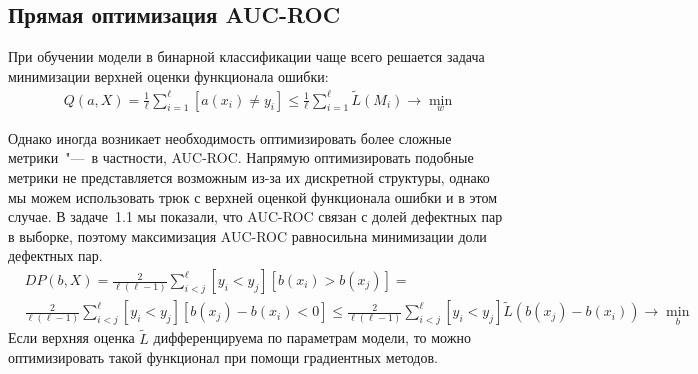 \documentclass[12pt,a4paper]{article}
\begin{document}
	\subsection{Прямая оптимизация AUC-ROC}
	\par При обучении модели в бинарной классификации чаще всего решается задача минимизации верхней оценки функционала ошибки:
	\begin{align*}
	Q(a, X) = \frac{1}{\ell}\sum_{i=1}^\ell [a(x_i) \ne y_i] \le \frac{1}{\ell} \sum_{i=1}^\ell \tilde{L}(M_i) \to \min_w
	\end{align*}
	
	Однако иногда возникает необходимость оптимизировать более сложные метрики~"---~в частности, AUC-ROC. Напрямую оптимизировать подобные метрики не представляется возможным из-за их дискретной структуры, однако мы можем использовать трюк с верхней оценкой функционала ошибки и в этом случае. В задаче~1.1 мы показали, что AUC-ROC связан с долей дефектных пар в выборке, поэтому максимизация AUC-ROC равносильна минимизации доли дефектных пар.
	\begin{align*}
	&DP(b, X) = \frac{2}{\ell (\ell - 1)}\sum_{i < j}^\ell [y_i < y_j] [b(x_i) > b(x_j)] =\\  &\frac{2}{\ell (\ell - 1)}\sum_{i < j}^\ell  [y_i < y_j] [b(x_j) - b(x_i) < 0] \le \frac{2}{\ell (\ell - 1)}\sum_{i < j}^\ell  [y_i < y_j] \tilde{L}(b(x_j) - b(x_i)) \to \min_b
	\end{align*}
	Если верхняя оценка $\tilde{L}$ дифференцируема по параметрам модели, то можно оптимизировать такой функционал при помощи градиентных методов.
\end{document}
